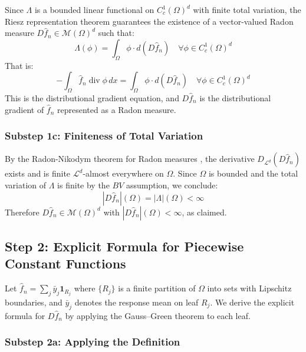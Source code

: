 \documentclass[12pt]{article}
\newcommand{\fn}{\hat{f}_n}
\begin{document}
	Since $\Lambda$ is a bounded linear functional on $C_c^1(\Omega)^d$ with
	finite total variation, the Riesz representation theorem
	\citep[Theorem~1.38]{evans2015measure} guarantees the existence of a
	vector-valued Radon measure $D\fn \in \mathcal{M}(\Omega)^d$ such that:
	\begin{equation}
		\Lambda(\phi) = \int_\Omega \phi \cdot d(D\fn)
		\quad \forall \phi \in C_c^1(\Omega)^d
	\end{equation}
	That is:
	\begin{equation}
		-\int_\Omega \fn \operatorname{div} \phi \, dx
		= \int_\Omega \phi \cdot d(D\fn)
		\quad \forall \phi \in C_c^1(\Omega)^d
	\end{equation}
	This is the distributional gradient equation, and $D\fn$ is the
	distributional gradient of $\fn$ represented as a Radon measure.
	
	\subsubsection*{Substep 1c: Finiteness of Total Variation}
	
	By the Radon-Nikodym theorem for Radon measures
	\citep[Theorem~1.29]{evans2015measure}, the derivative $D_{\mathcal{L}^d}(D\fn)$
	exists and is finite $\mathcal{L}^d$-almost everywhere on $\Omega$. Since
	$\Omega$ is bounded and the total variation of $\Lambda$ is finite by the
	$BV$ assumption, we conclude:
	\begin{equation}
		|D\fn|(\Omega) = |\Lambda|(\Omega) < \infty
	\end{equation}
	Therefore $D\fn \in \mathcal{M}(\Omega)^d$ with $|D\fn|(\Omega) < \infty$,
	as claimed.
	
	\subsection{Step 2: Explicit Formula for Piecewise Constant Functions}
	
	Let $\fn = \sum_j \bar{y}_j \mathbf{1}_{R_j}$ where $\{R_j\}$ is a finite
	partition of $\Omega$ into sets with Lipschitz boundaries, and $\bar{y}_j$
	denotes the response mean on leaf $R_j$. We derive the explicit formula for
	$D\fn$ by applying the Gauss--Green theorem to each leaf.
	
	\subsubsection*{Substep 2a: Applying the Definition}
	
\end{document}
